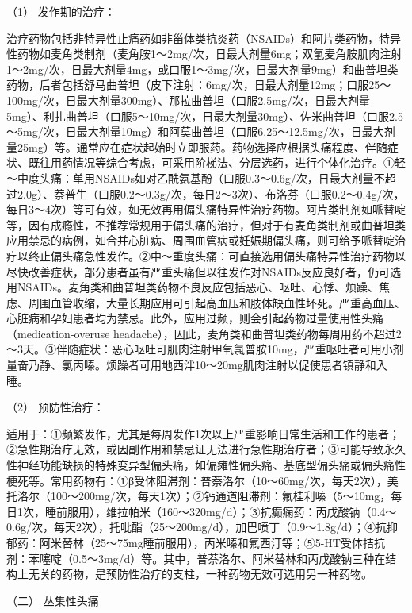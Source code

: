 \hypertarget{text00020.htmlux5cux23CHP1-7-4-1-2-1}{}
（1） 发作期的治疗：

治疗药物包括非特异性止痛药如非甾体类抗炎药（NSAIDs）和阿片类药物，特异性药物如麦角类制剂（麦角胺1～2mg/次，日最大剂量6mg；双氢麦角胺肌肉注射1～2mg/次，日最大剂量4mg，或口服1～3mg/次，日最大剂量9mg）和曲普坦类药物，后者包括舒马曲普坦（皮下注射：6mg/次，日最大剂量12mg；口服25～100mg/次，日最大剂量300mg）、那拉曲普坦（口服2.5mg/次，日最大剂量5mg）、利扎曲普坦（口服5～10mg/次，日最大剂量30mg）、佐米曲普坦（口服2.5～5mg/次，日最大剂量10mg）和阿莫曲普坦（口服6.25～12.5mg/次，日最大剂量25mg）等。通常应在症状起始时立即服药。药物选择应根据头痛程度、伴随症状、既往用药情况等综合考虑，可采用阶梯法、分层选药，进行个体化治疗。①轻～中度头痛：单用NSAIDs如对乙酰氨基酚（口服0.3～0.6g/次，日最大剂量不超过2.0g）、萘普生（口服0.2～0.3g/次，每日2～3次）、布洛芬（口服0.2～0.4g/次，每日3～4次）等可有效，如无效再用偏头痛特异性治疗药物。阿片类制剂如哌替啶等，因有成瘾性，不推荐常规用于偏头痛的治疗，但对于有麦角类制剂或曲普坦类应用禁忌的病例，如合并心脏病、周围血管病或妊娠期偏头痛，则可给予哌替啶治疗以终止偏头痛急性发作。②中～重度头痛：可直接选用偏头痛特异性治疗药物以尽快改善症状，部分患者虽有严重头痛但以往发作对NSAIDs反应良好者，仍可选用NSAIDs。麦角类和曲普坦类药物不良反应包括恶心、呕吐、心悸、烦躁、焦虑、周围血管收缩，大量长期应用可引起高血压和肢体缺血性坏死。严重高血压、心脏病和孕妇患者均为禁忌。此外，应用过频，则会引起药物过量使用性头痛（medication-overuse
headache），因此，麦角类和曲普坦类药物每周用药不超过2～3天。③伴随症状：恶心呕吐可肌肉注射甲氧氯普胺10mg，严重呕吐者可用小剂量奋乃静、氯丙嗪。烦躁者可用地西泮10～20mg肌肉注射以促使患者镇静和入睡。

\hypertarget{text00020.htmlux5cux23CHP1-7-4-1-2-2}{}
（2） 预防性治疗：

适用于：①频繁发作，尤其是每周发作1次以上严重影响日常生活和工作的患者；②急性期治疗无效，或因副作用和禁忌证无法进行急性期治疗者；③可能导致永久性神经功能缺损的特殊变异型偏头痛，如偏瘫性偏头痛、基底型偏头痛或偏头痛性梗死等。常用药物有：①β受体阻滞剂：普萘洛尔（10～60mg/次，每天2次），美托洛尔（100～200mg/次，每天1次）；②钙通道阻滞剂：氟桂利嗪（5～10mg，每日1次，睡前服用），维拉帕米（160～320mg/d）；③抗癫痫药：丙戊酸钠（0.4～0.6g/次，每天2次），托吡酯（25～200mg/d），加巴喷丁（0.9～1.8g/d）；④抗抑郁药：阿米替林（25～75mg睡前服用），丙米嗪和氟西汀等；⑤5-HT受体拮抗剂：苯噻啶（0.5～3mg/d）等。其中，普萘洛尔、阿米替林和丙戊酸钠三种在结构上无关的药物，是预防性治疗的支柱，一种药物无效可选用另一种药物。

\hypertarget{text00020.htmlux5cux23CHP1-7-4-2}{}
（二） 丛集性头痛


